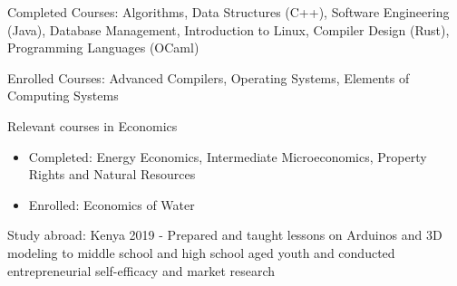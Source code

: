 \begin{cventries}
{\begin{cvitems}
\begin{itemize}
        \end{itemize}
    \else
    \item {Completed Courses: Algorithms, Data Structures (C++), Software
    Engineering (Java), Database Management, Introduction to Linux, Compiler Design (Rust), Programming Languages (OCaml)}
    \item {Enrolled Courses: Advanced Compilers, Operating Systems, Elements of Computing Systems}
    \fi
        \ifcv
        \item {Relevant courses in Economics}
        \begin{itemize}
          \item Completed: Energy Economics, Intermediate Microeconomics, Property Rights and Natural Resources
          \item Enrolled: Economics of Water
        \end{itemize}
        \fi
    \ifcv
\item {Study abroad: Kenya 2019 - Prepared and taught lessons on Arduinos and 3D modeling to
middle school and high school aged youth and conducted entrepreneurial self-efficacy and market research }
\fi
      \end{cvitems}
    }
    {}
\end{cventries}